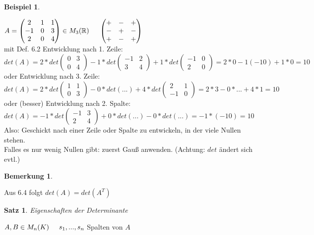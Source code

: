\documentclass[a4paper,11pt]{article}
\newtheorem{satz}[definition]{Satz}
\newtheorem{bsp}[definition]{Beispiel}
\newtheorem{bem}[definition]{Bemerkung}
\begin{document}
\begin{bsp}
\end{bsp}
$A=\begin{pmatrix}2&1&1\\-1&0&3\\2&0&4\end{pmatrix}\in M_3(\mathbb{R})\hspace{5mm}\begin{pmatrix}+&-&+\\-&+&-\\+&-&+\end{pmatrix}$ \\
mit Def. 6.2 Entwicklung nach 1. Zeile: \\
$det(A)=2*det\begin{pmatrix}0&3\\0&4\end{pmatrix}-1*det\begin{pmatrix}-1&2\\3&4\end{pmatrix}+1*det\begin{pmatrix}-1&0\\2&0\end{pmatrix}=2*0-1(-10)+1*0=10$ \\
oder Entwicklung nach 3. Zeile: \\
$det(A)=2*det\begin{pmatrix}1&1\\0&3\end{pmatrix}-0*det(...)+4*det\begin{pmatrix}2&1\\-1&0\end{pmatrix}=2*3-0*...+4*1=10$ \\
oder (besser) Entwicklung nach 2. Spalte: \\
$det(A)=-1*det\begin{pmatrix}-1&3\\2&4\end{pmatrix}+0*det(...)-0*det(...)=-1*(-10)=10$ \\
Also: Geschickt nach einer Zeile oder Spalte zu entwickeln, in der viele Nullen stehen. \\
Falles es nur wenig Nullen gibt: zuerst Gauß anwenden. (Achtung: $det$ ändert sich evtl.)
\begin{bem}
\end{bem}
Aus 6.4 folgt $det(A)=det(A^T)$
\begin{satz}
Eigenschaften der Determinante
\end{satz}
$A,B\in M_n(K)\hspace{5mm}s_1,...,s_n$ Spalten von $A$ \\
\end{document}
